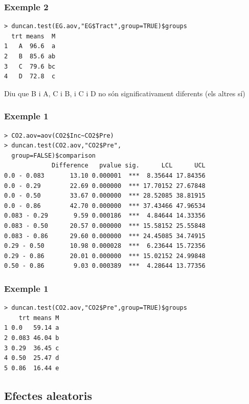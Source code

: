 \documentclass[12pt,t]{beamer}
\theoremstyle{plain}
\theoremstyle{definition}
\begin{document}
\begin{frame}[fragile]
\frametitle{Exemple 2}
\vspace*{-3ex}

{\small
\begin{verbatim}
> duncan.test(EG.aov,"EG$Tract",group=TRUE)$groups
  trt means  M
1   A  96.6  a
2   B  85.6 ab
3   C  79.6 bc
4   D  72.8  c
\end{verbatim}
}
Diu que B i A, C i B, i C i D no són significativament diferents (els altres sí)
\end{frame}


\begin{frame}[fragile]
\frametitle{Exemple 1}
\vspace*{-3ex}

{\footnotesize
\begin{verbatim}
> CO2.aov=aov(CO2$Inc~CO2$Pre)
> duncan.test(CO2.aov,"CO2$Pre",
  group=FALSE)$comparison
             Difference   pvalue sig.      LCL      UCL
0.0 - 0.083       13.10 0.000001  ***  8.35644 17.84356
0.0 - 0.29        22.69 0.000000  *** 17.70152 27.67848
0.0 - 0.50        33.67 0.000000  *** 28.52085 38.81915
0.0 - 0.86        42.70 0.000000  *** 37.43466 47.96534
0.083 - 0.29       9.59 0.000186  ***  4.84644 14.33356
0.083 - 0.50      20.57 0.000000  *** 15.58152 25.55848
0.083 - 0.86      29.60 0.000000  *** 24.45085 34.74915
0.29 - 0.50       10.98 0.000028  ***  6.23644 15.72356
0.29 - 0.86       20.01 0.000000  *** 15.02152 24.99848
0.50 - 0.86        9.03 0.000389  ***  4.28644 13.77356
\end{verbatim}
}

\end{frame}


\begin{frame}[fragile]
\frametitle{Exemple 1}
\vspace*{-3ex}

{\small
\begin{verbatim}
> duncan.test(CO2.aov,"CO2$Pre",group=TRUE)$groups
    trt means M
1 0.0   59.14 a
2 0.083 46.04 b
3 0.29  36.45 c
4 0.50  25.47 d
5 0.86  16.44 e
\end{verbatim}
}

\end{frame}

\subsection{Efectes aleatoris}
\end{document}
